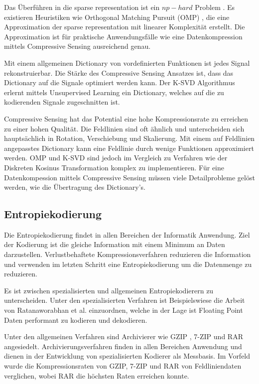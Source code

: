 Das Überführen in die sparse representation ist ein $np-hard$ Problem \cite{wiki:npHard}. Es existieren Heuristiken wie Orthogonal Matching Pursuit (OMP) \cite{tropp2007signal}, die eine Approximation der sparse representation mit linearer Komplexität erstellt. Die Approximation ist für praktische Anwendungsfälle wie eine Datenkompression mittels Compressive Sensing ausreichend genau.

Mit einem allgemeinen Dictionary von vordefinierten Funktionen ist jedes Signal rekonstruierbar. Die Stärke des Compressive Sensing Ansatzes ist, dass das Dictionary auf die Signale optimiert werden kann. Der K-SVD \cite{bryt2008compression} Algorithmus erlernt mittels Unsupervised Learning ein Dictionary, welches auf die zu kodierenden Signale zugeschnitten ist. 

Compressive Sensing hat das Potential eine hohe Kompressionsrate zu erreichen zu einer hohen Qualität. Die Feldlinien sind oft ähnlich und unterscheiden sich hauptsächlich in Rotation, Verschiebung und Skalierung. Mit einem auf Feldlinien angepasstes Dictionary kann eine Feldlinie durch wenige Funktionen approximiert werden. OMP und K-SVD sind jedoch im Vergleich zu Verfahren wie der Diskreten Kosinus Transformation komplex zu implementieren. Für eine Datenkompession mittels Compressive Sensing müssen viele Detailprobleme gelöst werden, wie die Übertragung des Dictionary's.

\subsection{Entropiekodierung}
Die Entropiekodierung findet in allen Bereichen der Informatik Anwendung. Ziel der Kodierung ist die gleiche Information mit einem Minimum an Daten darzustellen. Verlustbehaftete Kompressionsverfahren reduzieren die Information und verwenden im letzten Schritt eine Entropiekodierung um die Datenmenge zu reduzieren.

Es ist zwischen spezialisierten und allgemeinen Entropiekodierern zu unterscheiden. Unter den spezialisierten Verfahren ist Beispielswiese die Arbeit von Ratanaworabhan et al. \cite{ratanaworabhan2006fast} einzuordnen, welche in der Lage ist Floating Point Daten performant zu kodieren und dekodieren.
 
Unter den allgemeinen Verfahren sind Archivierer wie GZIP \cite{website:gzip}, 7-ZIP \cite{website:7zip} und RAR \cite{website:rar} angesiedelt. Archivierungsverfahren finden in allen Bereichen Anwendung und dienen in der Entwicklung von spezialisierten Kodierer als Messbasis. Im Vorfeld wurde die Kompressionsraten von GZIP, 7-ZIP und RAR von Feldliniendaten verglichen, wobei RAR die höchsten Raten erreichen konnte.

